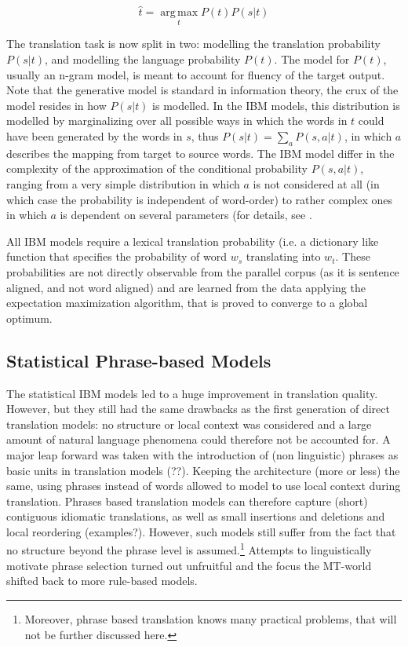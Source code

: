 \documentclass{report}
\theoremstyle{definition}
\theoremstyle{plain}
\begin{document}
\[
\hat{t} = \operatorname*{arg\,max}_t P(t)P(s|t)
\]

The translation task is now split in two: modelling the translation probability $P(s|t)$, and modelling the language probability $P(t)$. The model for $P(t)$, usually an n-gram model, is meant to account for fluency of the target output. Note that the generative model is standard in information theory, the crux of the model resides in how $P(s|t)$ is modelled. In the IBM models, this distribution is modelled by marginalizing over all possible ways in which the words in $t$ could have been generated by the words in $s$, thus $P(s|t) = \sum_a P(s,a|t)$, in which $a$ describes the mapping from target to source words. The IBM model differ in the complexity of the approximation of the conditional probability $P(s,a|t)$, ranging from a very simple distribution in which $a$ is not considered at all (in which case the probability is independent of word-order) to rather complex ones in which $a$ is dependent on several parameters (for details, see \cite{brown1993mathematics}.


All IBM models require a lexical translation probability (i.e. a dictionary like function that specifies the probability of word $w_s$ translating into $w_t$. These probabilities are not directly observable from the parallel corpus (as it is sentence aligned, and not word aligned) and are learned from the data applying the expectation maximization algorithm, that is proved to converge to a global optimum.

\subsection{Statistical Phrase-based Models}

The statistical IBM models led to a huge improvement in translation quality. However, but they still had the same drawbacks as the first generation of direct translation models: no structure or local context was considered and a large amount of natural language phenomena could therefore not be accounted for. A major leap forward was taken with the introduction of (non linguistic) phrases as basic units in translation models (\cite{wang1998grammar,och1999improved}??). Keeping the architecture (more or less) the same, using phrases instead of words allowed to model to use local context during translation. Phrases based translation models can therefore capture (short) contiguous idiomatic translations, as well as small insertions and deletions and local reordering (examples?). However, such models still suffer from the fact that no structure beyond the phrase level is assumed.\footnote{Moreover, phrase based translation knows many practical problems, that will not be further discussed here.} Attempts to linguistically motivate phrase selection turned out unfruitful \citep{koehn2003statistical} and the focus the MT-world shifted back to more rule-based models.
\end{document}
